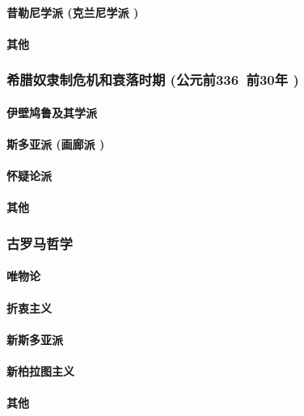 \documentclass[UTF8]{../RepresentationUniverse}
\begin{document}
        \paragraph{昔勒尼学派 (克兰尼学派 )}
        \paragraph{其他}


    \subsubsection{希腊奴隶制危机和衰落时期 (公元前336~前30年 )}
        \paragraph{伊壁鸠鲁及其学派}
        \paragraph{斯多亚派 (画廊派 )}
        \paragraph{怀疑论派}
        \paragraph{其他}

    \subsubsection{古罗马哲学}
        \paragraph{唯物论}
        \paragraph{折衷主义}
        \paragraph{新斯多亚派}
        \paragraph{新柏拉图主义}
        \paragraph{其他}
\end{document}
